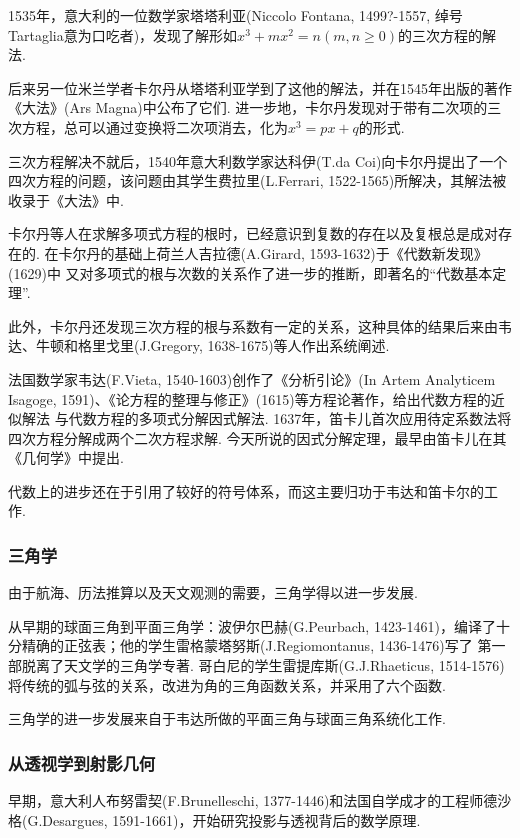 \documentclass{Math_Note}
\begin{document}
1535年，意大利的一位数学家塔塔利亚(Niccolo Fontana, 1499?-1557, 绰号Tartaglia意为口吃者)，发现了解形如$x^{3}+mx^{2}=n (m,n \geq 0)$的三次方程的解法.

后来另一位米兰学者卡尔丹从塔塔利亚学到了这他的解法，并在1545年出版的著作《大法》(Ars Magna)中公布了它们. 
进一步地，卡尔丹发现对于带有二次项的三次方程，总可以通过变换将二次项消去，化为$x^{3}=px+q$的形式.

三次方程解决不就后，1540年意大利数学家达科伊(T.da Coi)向卡尔丹提出了一个四次方程的问题，该问题由其学生费拉里(L.Ferrari, 1522-1565)所解决，其解法被收录于《大法》中.

卡尔丹等人在求解多项式方程的根时，已经意识到复数的存在以及复根总是成对存在的. 在卡尔丹的基础上荷兰人吉拉德(A.Girard, 1593-1632)于《代数新发现》(1629)中
又对多项式的根与次数的关系作了进一步的推断，即著名的“代数基本定理”.

此外，卡尔丹还发现三次方程的根与系数有一定的关系，这种具体的结果后来由韦达、牛顿和格里戈里(J.Gregory, 1638-1675)等人作出系统阐述. 

法国数学家韦达(F.Vieta, 1540-1603)创作了《分析引论》(In Artem Analyticem Isagoge, 1591)、《论方程的整理与修正》(1615)等方程论著作，给出代数方程的近似解法
与代数方程的多项式分解因式解法. 1637年，笛卡儿首次应用待定系数法将四次方程分解成两个二次方程求解. 今天所说的因式分解定理，最早由笛卡儿在其《几何学》中提出. 

代数上的进步还在于引用了较好的符号体系，而这主要归功于韦达和笛卡尔的工作. 

\subsubsection{三角学}
由于航海、历法推算以及天文观测的需要，三角学得以进一步发展.

从早期的球面三角到平面三角学：波伊尔巴赫(G.Peurbach, 1423-1461)，编译了十分精确的正弦表；他的学生雷格蒙塔努斯(J.Regiomontanus, 1436-1476)写了
第一部脱离了天文学的三角学专著. 哥白尼的学生雷提库斯(G.J.Rhaeticus, 1514-1576)将传统的弧与弦的关系，改进为角的三角函数关系，并采用了六个函数.

三角学的进一步发展来自于韦达所做的平面三角与球面三角系统化工作.

\subsubsection{从透视学到射影几何}
早期，意大利人布努雷契(F.Brunelleschi, 1377-1446)和法国自学成才的工程师德沙格(G.Desargues, 1591-1661)，开始研究投影与透视背后的数学原理.
\end{document}
